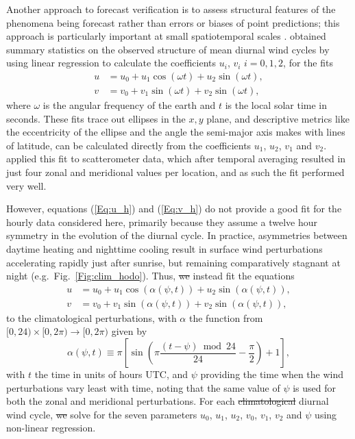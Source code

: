 \documentclass{ametsoc}
\providecommand{\DIFadd}[1]{{\protect\color{blue}\uwave{#1}}} %
\providecommand{\DIFdel}[1]{{\protect\color{red}\sout{#1}}}                      %
\providecommand{\DIFaddbegin}{} %
\providecommand{\DIFaddend}{} %
\providecommand{\DIFdelbegin}{} %
\providecommand{\DIFdelend}{} %
\begin{document}
\DIFaddend Another approach to forecast verification is to assess structural features of the phenomena being forecast rather than errors or biases of point predictions; this approach is particularly important at small spatiotemporal scales \citep[e.g.][]{mass02, rife05}. \citet{gille05} obtained summary statistics on the observed structure of mean diurnal wind cycles by using linear regression to calculate the coefficients $u_i$, $v_i$ $i=0,1,2$, for the fits 
\begin{align}
u &= u_0 + u_1 \cos(\omega t) + u_2 \sin(\omega t), \label{Eq:u_h} \\
v &= v_0 + v_1 \sin(\omega t) + v_2 \sin(\omega t), \label{Eq:v_h}
\end{align}
where $\omega$ is the angular frequency of the earth and $t$ is the local solar time in seconds. These fits trace out ellipses in the $x,y$ plane, and descriptive metrics like the eccentricity of the ellipse and the angle the semi-major axis makes with lines of latitude, can be calculated directly from the coefficients $u_1$, $u_2$, $v_1$ and $v_2$. \citet{gille05} applied this fit to scatterometer data, which after temporal averaging resulted in just four zonal and meridional values per location, and as such the fit performed very well.  

However, equations (\ref{Eq:u_h}) and (\ref{Eq:v_h}) do not provide a good fit for the hourly data considered here, primarily because they assume a twelve hour symmetry in the evolution of the diurnal cycle. In practice, asymmetries between daytime heating and nighttime cooling \citep[e.g.][]{svensson11} result in surface wind perturbations accelerating rapidly just after sunrise, but remaining comparatively stagnant at night (e.g.~Fig.~\ref{Fig:clim_hodo}). Thus, \DIFdelbegin \DIFdel{we }\DIFdelend \DIFaddbegin \DIFadd{I }\DIFaddend instead fit the equations
\begin{align}
u &= u_0 + u_1 \cos(\alpha(\psi,t)) + u_2 \sin(\alpha(\psi,t)), \label{Eq:u} \\
v &= v_0 + v_1 \sin(\alpha(\psi,t)) + v_2 \sin(\alpha(\psi,t)), \label{Eq:v}
\end{align}
to the climatological perturbations, with $\alpha$ the function from $[0,24) \times [0, 2\pi) \to [0, 2\pi)$ given by
\begin{equation}
\alpha(\psi,t) \equiv \pi \left[\sin\left( \pi \frac{(t - \psi)  \bmod 24}{24} - \frac{\pi}{2} \right) + 1 \right], \label{Eq:alpha}
\end{equation}
with $t$ the time in units of hours UTC, and $\psi$ providing the time when the wind perturbations vary least with time, noting that the same value of $\psi$ is used for both the zonal and meridional perturbations. For each \DIFdelbegin \DIFdel{climatological }\DIFdelend \DIFaddbegin \DIFadd{mean }\DIFaddend diurnal wind cycle, \DIFdelbegin \DIFdel{we }\DIFdelend \DIFaddbegin \DIFadd{I }\DIFaddend solve for the seven parameters $u_0$, $u_1$, $u_2$, $v_0$, $v_1$, $v_2$ and $\psi$ using non-linear regression.
\end{document}
